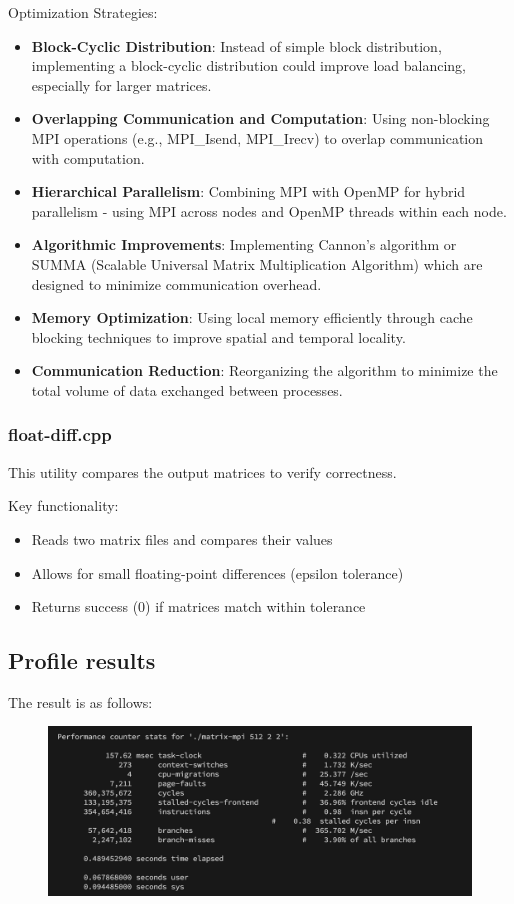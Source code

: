 \documentclass{article}
\begin{document}
Optimization Strategies:

\begin{itemize}
    \item \textbf{Block-Cyclic Distribution}: Instead of simple block distribution, implementing a block-cyclic distribution could improve load balancing, especially for larger matrices.
    \item \textbf{Overlapping Communication and Computation}: Using non-blocking MPI operations (e.g., MPI\_Isend, MPI\_Irecv) to overlap communication with computation.
    \item \textbf{Hierarchical Parallelism}: Combining MPI with OpenMP for hybrid parallelism - using MPI across nodes and OpenMP threads within each node.
    \item \textbf{Algorithmic Improvements}: Implementing Cannon's algorithm or SUMMA (Scalable Universal Matrix Multiplication Algorithm) which are designed to minimize communication overhead.
    \item \textbf{Memory Optimization}: Using local memory efficiently through cache blocking techniques to improve spatial and temporal locality.
    \item \textbf{Communication Reduction}: Reorganizing the algorithm to minimize the total volume of data exchanged between processes.
\end{itemize}

\subsubsection*{float-diff.cpp}
This utility compares the output matrices to verify correctness.

Key functionality:
\begin{itemize}
    \item Reads two matrix files and compares their values
    \item Allows for small floating-point differences (epsilon tolerance)
    \item Returns success (0) if matrices match within tolerance
\end{itemize}

\subsection*{Profile results}

The result is as follows:

\begin{figure}[htbp]
    \centering
    \includegraphics[width=1\textwidth]{./img/q2-2.png}
\end{figure}
\end{document}
